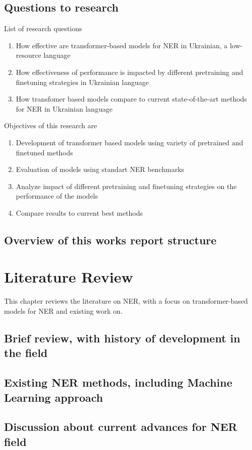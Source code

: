 \documentclass[a4paper,12pt]{report}
\begin{document}
\section{Questions to research}
List of research questions
\begin{enumerate}
    \item How effective are transformer-based models for NER in Ukrainian, a low-resource language
    \item How effectiveness of performance is impacted by different pretraining and finetuning strategies in Ukrainian language
    \item How transfomer based models compare to current state-of-the-art methods for NER in Ukrainian language
\end{enumerate}
Objectives of this research are
\begin{enumerate}
    \item Development of transformer based models using variety of pretrained and finetuned methods
    \item Evaluation of models using standart NER benchmarks
    \item Analyze impact of different pretraining and finetuning strategies on the performance of the models
    \item Compare results to current best methods
\end{enumerate}
\section{Overview of this works report structure}

\chapter{Literature Review}
This chapter reviews the literature on NER, with a focus on transformer-based models for NER and existing work on.
\section{Brief review, with history of development in the field}
\section{Existing NER methods, including Machine Learning approach}
\section{Discussion about current advances for NER field}
\end{document}
